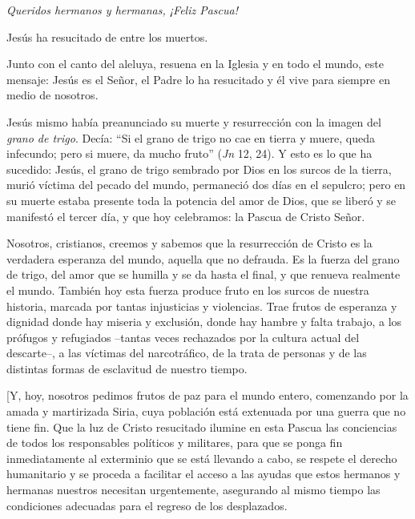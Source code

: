 			\begin{body}\textit{Queridos hermanos y hermanas, ¡Feliz Pascua!}\end{body}
			
			\begin{body}Jesús ha resucitado de entre los muertos.\end{body}
			
			\begin{body}Junto con el canto del aleluya, resuena en la Iglesia y en todo el mundo, este mensaje: Jesús es el Señor, el Padre lo ha resucitado y él vive para siempre en medio de nosotros.\end{body}
			
			\begin{body}Jesús mismo había preanunciado su muerte y resurrección con la imagen del \textit{grano de trigo}. Decía: “Si el grano de trigo no cae en tierra y muere, queda infecundo; pero si muere, da mucho fruto” (\textit{Jn} 12, 24). Y esto es lo que ha sucedido: Jesús, el grano de trigo sembrado por Dios en los surcos de la tierra, murió víctima del pecado del mundo, permaneció dos días en el sepulcro; pero en su muerte estaba presente toda la potencia del amor de Dios, que se liberó y se manifestó el tercer día, y que hoy celebramos: la Pascua de Cristo Señor.\end{body}
			
			\begin{body}Nosotros, cristianos, creemos y sabemos que la resurrección de Cristo es la verdadera esperanza del mundo, aquella que no defrauda. Es la fuerza del grano de trigo, del amor que se humilla y se da hasta el final, y que renueva realmente el mundo. También hoy esta fuerza produce fruto en los surcos de nuestra historia, marcada por tantas injusticias y violencias. Trae frutos de esperanza y dignidad donde hay miseria y exclusión, donde hay hambre y falta trabajo, a los prófugos y refugiados –tantas veces rechazados por la cultura actual del descarte–, a las víctimas del narcotráfico, de la trata de personas y de las distintas formas de esclavitud de nuestro tiempo.\end{body}
			
			\begin{body}\begin{bodysmall}[Y, hoy, nosotros pedimos frutos de paz para el mundo entero, comenzando por la amada y martirizada Siria, cuya población está extenuada por una guerra que no tiene fin. Que la luz de Cristo resucitado ilumine en esta Pascua las conciencias de todos los responsables políticos y militares, para que se ponga fin inmediatamente al exterminio que se está llevando a cabo, se respete el derecho humanitario y se proceda a facilitar el acceso a las ayudas que estos hermanos y hermanas nuestros necesitan urgentemente, asegurando al mismo tiempo las condiciones adecuadas para el regreso de los desplazados.\end{bodysmall}\end{body}
			
